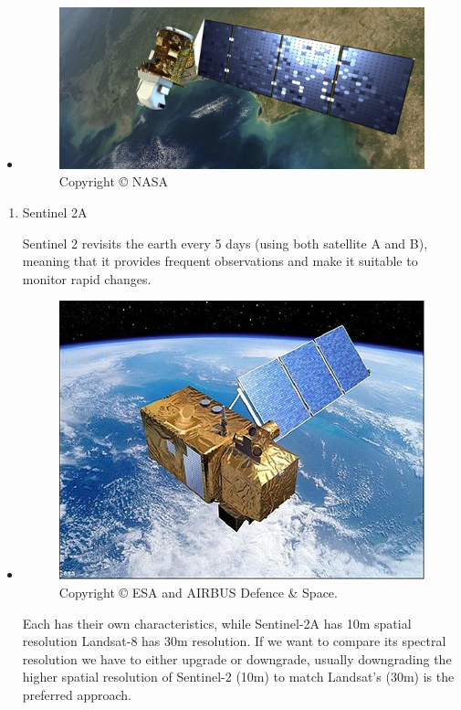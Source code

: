\documentclass[
  letterpaper,
  DIV=11,
  numbers=noendperiod]{scrreprt}
\begin{document}
\begin{itemize}
\item
  \begin{figure}

  {\centering \includegraphics[width=4.1875in,height=\textheight]{images/clipboard-1188776161.png}

  }

  \caption{Copyright © NASA}

  \end{figure}
\end{itemize}

\begin{enumerate}
\def\labelenumi{\arabic{enumi}.}
\setcounter{enumi}{1}
\item
  Sentinel 2A

  Sentinel 2 revisits the earth every 5 days (using both satellite A and
  B), meaning that it provides frequent observations and make it
  suitable to monitor rapid changes.
\end{enumerate}

\begin{itemize}
\item
  \begin{figure}

  {\centering \includegraphics{images/clipboard-3938270325.png}

  }

  \caption{Copyright © ESA and AIRBUS Defence \& Space.}

  \end{figure}

  Each has their own characteristics, while Sentinel-2A has 10m spatial
  resolution Landsat-8 has 30m resolution. If we want to compare its
  spectral resolution we have to either upgrade or downgrade, usually
  downgrading the higher spatial resolution of Sentinel-2 (10m) to match
  Landsat's (30m) is the preferred approach.
\end{itemize}
\end{document}
